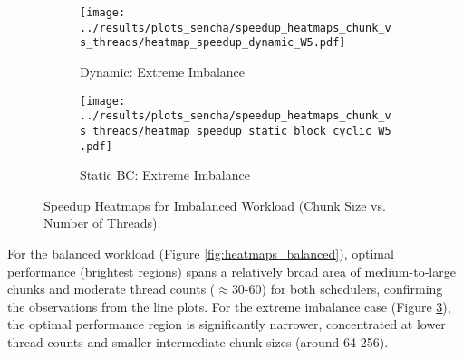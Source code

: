\documentclass[10pt]{article}
\begin{document}
\begin{figure}[H]
    \centering
    \begin{subfigure}[b]{0.49\textwidth}
        \centering
        \texttt{[image: ../results/plots\_sencha/speedup\_heatmaps\_chunk\_vs\_threads/heatmap\_speedup\_dynamic\_W5.pdf]}
        \caption{Dynamic: Extreme Imbalance}
        \label{fig:heatmap_dynamic_imbalance}
    \end{subfigure}
    \hfill
    \begin{subfigure}[b]{0.49\textwidth}
        \centering
        \texttt{[image: ../results/plots\_sencha/speedup\_heatmaps\_chunk\_vs\_threads/heatmap\_speedup\_static\_block\_cyclic\_W5.pdf]}
        \caption{Static BC: Extreme Imbalance}
        \label{fig:heatmap_sbc_imbalance}
    \end{subfigure}
    \caption{Speedup Heatmaps for Imbalanced Workload (Chunk Size vs. Number of Threads).}
    \label{fig:heatmaps_imbalanced}
\end{figure}

For the balanced workload (Figure \ref{fig:heatmaps_balanced}), optimal performance (brightest regions) spans a relatively broad area of medium-to-large chunks and moderate thread counts ($\approx$30-60) for both schedulers, confirming the observations from the line plots. For the extreme imbalance case (Figure \ref{fig:heatmaps_imbalanced}), the optimal performance region is significantly narrower, concentrated at lower thread counts and smaller intermediate chunk sizes (around 64-256).


\end{document}
